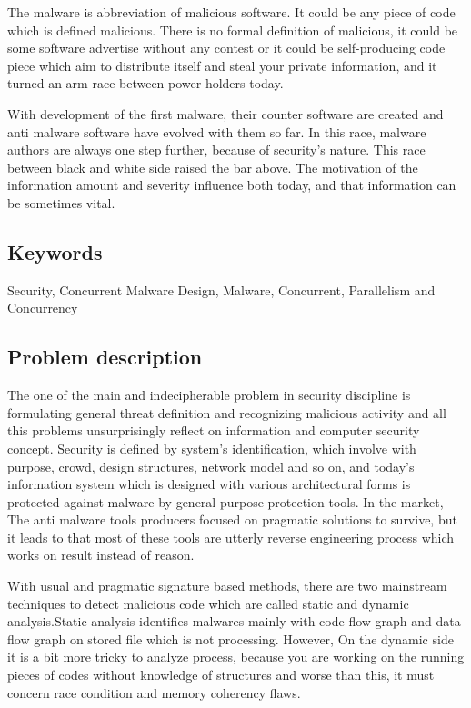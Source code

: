 The malware is abbreviation of malicious software. It could be any piece of code which is defined malicious. There is no formal definition of malicious, it could be some software advertise without any contest or it could be self-producing code piece which aim to distribute itself and steal your private information, and it turned an arm race between power holders today.

With development of the first malware, their counter software are created and anti malware software have evolved with them so far. In this race, malware authors are always one step further, because of security's nature. This race between black and white side raised the bar above. The motivation of the information amount and severity influence both today, and that information can be sometimes vital. 


\subsection{Keywords}
Security, Concurrent Malware Design, Malware, Concurrent, Parallelism and Concurrency

\subsection{Problem description}
The one of the main and indecipherable problem in security discipline is formulating general threat definition and recognizing malicious activity and all this problems unsurprisingly reflect on information and computer security concept. Security is defined by system’s identification, which involve with purpose, crowd, design structures, network model and so on, and today’s information system which is designed with various architectural forms is protected against malware by general purpose protection tools. In the market, The anti malware tools producers focused on pragmatic solutions to survive, but it leads to that most of these tools are utterly reverse engineering process which works on result instead of reason.

With usual and pragmatic signature based methods, there are two mainstream techniques to detect malicious code which are called static and dynamic analysis.Static analysis identifies malwares mainly with code flow graph and data flow graph on stored file which is not processing. However, On the dynamic side it is a bit more tricky to analyze process, because you are working on the running pieces of codes without knowledge of structures and worse than this, it must concern race condition and memory coherency flaws.

